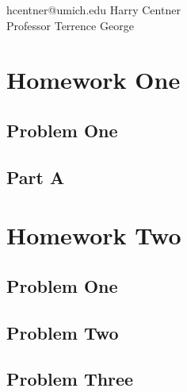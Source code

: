 \documentclass[12pt]{article}
\renewcommand{\maketitle}{%
\begin {flushleft}{\fontsize{25pt}{33pt}\bfseries
\theauthor}}
\begin{document}
\author{Problem Set 1}
\date{\today}
\fancyhead{}

\maketitle

\vspace{.7em} %

\large{hcentner@umich.edu \hfill Harry Centner} \\
\hfill Professor Terrence George 


\end{flushleft}



\section{Homework One}
	\subsection{Problem One}
	\begin{center} \end{center}
	\subsection{Part A}
	\begin{center} \end{center}
	
\section{Homework Two}
	\subsection{Problem One}
	\begin{center} \end{center}
	

	\subsection{Problem Two}
	\begin{center} \end{center}


	\subsection{Problem Three}
	\begin{center} \end{center}
\end{document}

